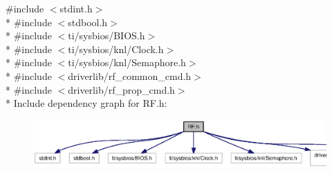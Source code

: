 {\ttfamily \#include $<$stdint.\+h$>$}\\*
{\ttfamily \#include $<$stdbool.\+h$>$}\\*
{\ttfamily \#include $<$ti/sysbios/\+B\+I\+O\+S.\+h$>$}\\*
{\ttfamily \#include $<$ti/sysbios/knl/\+Clock.\+h$>$}\\*
{\ttfamily \#include $<$ti/sysbios/knl/\+Semaphore.\+h$>$}\\*
{\ttfamily \#include $<$driverlib/rf\+\_\+common\+\_\+cmd.\+h$>$}\\*
{\ttfamily \#include $<$driverlib/rf\+\_\+prop\+\_\+cmd.\+h$>$}\\*
Include dependency graph for R\+F.\+h\+:
\nopagebreak
\begin{figure}[H]
\begin{center}
\leavevmode
\includegraphics[width=350pt]{_r_f_8h__incl}
\end{center}
\end{figure}
